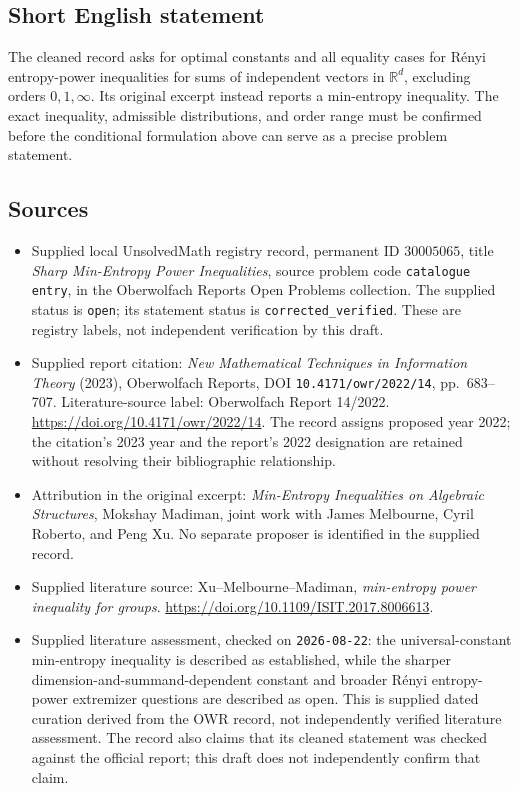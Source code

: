 \documentclass[11pt]{article}
\newcommand{\R}{\mathbb{R}}
\begin{document}
\subsection{Short English statement}
The cleaned record asks for optimal constants and all equality cases for Rényi entropy-power inequalities for sums of independent vectors in \(\R^d\), excluding orders \(0,1,\infty\). Its original excerpt instead reports a min-entropy inequality. The exact inequality, admissible distributions, and order range must be confirmed before the conditional formulation above can serve as a precise problem statement.
\subsection{Sources}
\begin{itemize}
\item Supplied local UnsolvedMath registry record, permanent ID \(30005065\), title \emph{Sharp Min-Entropy Power Inequalities}, source problem code \texttt{catalogue entry}, in the Oberwolfach Reports Open Problems collection. The supplied status is \texttt{open}; its statement status is \texttt{corrected\_verified}. These are registry labels, not independent verification by this draft.
\item Supplied report citation: \emph{New Mathematical Techniques in Information Theory} (2023), Oberwolfach Reports, DOI \texttt{10.4171/owr/2022/14}, pp.\ 683--707. Literature-source label: Oberwolfach Report 14/2022. \url{https://doi.org/10.4171/owr/2022/14}. The record assigns proposed year 2022; the citation's 2023 year and the report's 2022 designation are retained without resolving their bibliographic relationship.
\item Attribution in the original excerpt: \emph{Min-Entropy Inequalities on Algebraic Structures}, Mokshay Madiman, joint work with James Melbourne, Cyril Roberto, and Peng Xu. No separate proposer is identified in the supplied record.
\item Supplied literature source: Xu--Melbourne--Madiman, \emph{min-entropy power inequality for groups}. \url{https://doi.org/10.1109/ISIT.2017.8006613}.
\item Supplied literature assessment, checked on \texttt{2026-08-22}: the universal-constant min-entropy inequality is described as established, while the sharper dimension-and-summand-dependent constant and broader Rényi entropy-power extremizer questions are described as open. This is supplied dated curation derived from the OWR record, not independently verified literature assessment. The record also claims that its cleaned statement was checked against the official report; this draft does not independently confirm that claim.
\end{itemize}
\end{document}
